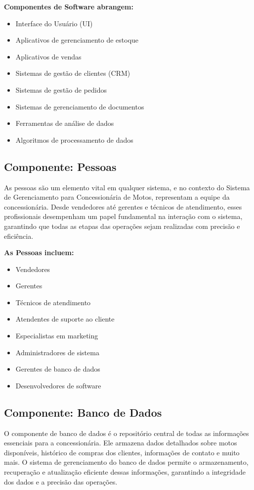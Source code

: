 	\textbf{Componentes de Software abrangem:}
	
	\begin{itemize}
		\item Interface do Usuário (UI)
		\item Aplicativos de gerenciamento de estoque
		\item Aplicativos de vendas
		\item Sistemas de gestão de clientes (CRM)
		\item Sistemas de gestão de pedidos
		\item Sistemas de gerenciamento de documentos
		\item Ferramentas de análise de dados
		\item Algoritmos de processamento de dados
	\end{itemize}
	
	
     \subsection{Componente: Pessoas}
	As pessoas são um elemento vital em qualquer sistema, e no contexto do Sistema de Gerenciamento para Concessionária de Motos, representam a equipe da concessionária. Desde vendedores até gerentes e técnicos de atendimento, esses profissionais desempenham um papel fundamental na interação com o sistema, garantindo que todas as etapas das operações sejam realizadas com precisão e eficiência.
	
	\textbf{As Pessoas incluem:}
	
	\begin{itemize}
		\item Vendedores
		\item Gerentes
		\item Técnicos de atendimento
		\item Atendentes de suporte ao cliente
		\item Especialistas em marketing
		\item Administradores de sistema
		\item Gerentes de banco de dados
		\item Desenvolvedores de software
	\end{itemize}


     \subsection{Componente: Banco de Dados}
     O componente de banco de dados é o repositório central de todas as informações essenciais para a concessionária. Ele armazena dados detalhados sobre motos disponíveis, histórico de compras dos clientes, informações de contato e muito mais. O sistema de gerenciamento do banco de dados permite o armazenamento, recuperação e atualização eficiente dessas informações, garantindo a integridade dos dados e a precisão das operações.
     
